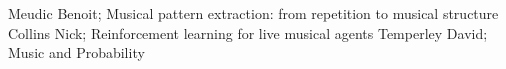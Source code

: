 \documentclass[a4paper,10pt]{article}
\begin{document}

\begin{thebibliography}{99}
 Meudic Benoit; Musical pattern extraction: from repetition to musical structure
 Collins Nick; Reinforcement learning for live musical agents
 Temperley David; Music and Probability



\end{thebibliography}
\end{document}
